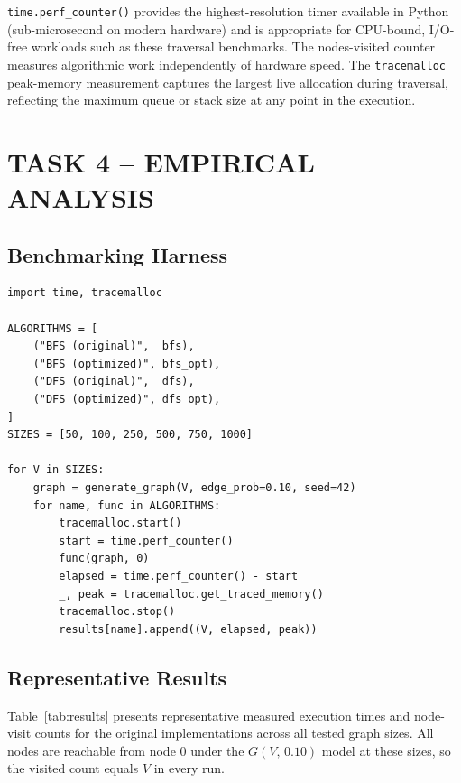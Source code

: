 \documentclass[12pt,a4paper]{article}
\begin{document}
	\noindent \texttt{time.perf\_counter()} provides the highest-resolution timer
	available in Python (sub-microsecond on modern hardware) and is appropriate for
	CPU-bound, I/O-free workloads such as these traversal benchmarks. The nodes-visited
	counter measures algorithmic work independently of hardware speed. The
	\texttt{tracemalloc} peak-memory measurement captures the largest live allocation
	during traversal, reflecting the maximum queue or stack size at any point in the
	execution.
	
	\section{TASK 4 -- EMPIRICAL ANALYSIS}
	
	\subsection{Benchmarking Harness}
	
	\begin{lstlisting}[caption={Benchmarking loop -- all four variants timed on identical graph copies.}]
import time, tracemalloc
		
ALGORITHMS = [
	("BFS (original)",  bfs),
	("BFS (optimized)", bfs_opt),
	("DFS (original)",  dfs),
	("DFS (optimized)", dfs_opt),
]
SIZES = [50, 100, 250, 500, 750, 1000]
		
for V in SIZES:
	graph = generate_graph(V, edge_prob=0.10, seed=42)
	for name, func in ALGORITHMS:
		tracemalloc.start()
		start = time.perf_counter()
		func(graph, 0)
		elapsed = time.perf_counter() - start
		_, peak = tracemalloc.get_traced_memory()
		tracemalloc.stop()
		results[name].append((V, elapsed, peak))
	\end{lstlisting}
	
	\subsection{Representative Results}
	
	Table~\ref{tab:results} presents representative measured execution times and
	node-visit counts for the original implementations across all tested graph sizes.
	All nodes are reachable from node 0 under the $G(V,\,0.10)$ model at these sizes,
	so the visited count equals $V$ in every run.
	
\end{document}
